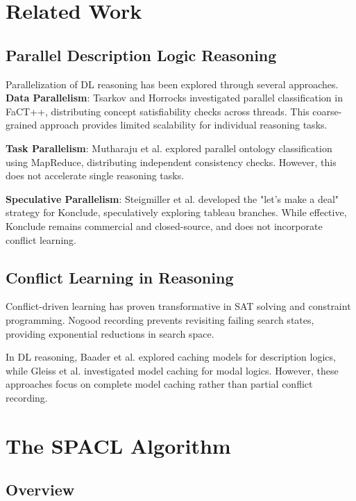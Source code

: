 \documentclass[10pt,a4paper]{article}
\begin{document}
\section{Related Work}
\label{sec:related}

\subsection{Parallel Description Logic Reasoning}

Parallelization of DL reasoning has been explored through several approaches. \textbf{Data Parallelism}: Tsarkov and Horrocks investigated parallel classification in FaCT++, distributing concept satisfiability checks across threads. This coarse-grained approach provides limited scalability for individual reasoning tasks.

\textbf{Task Parallelism}: Mutharaju et al. explored parallel ontology classification using MapReduce, distributing independent consistency checks. However, this does not accelerate single reasoning tasks.

\textbf{Speculative Parallelism}: Steigmiller et al. developed the "let's make a deal" strategy for Konclude, speculatively exploring tableau branches. While effective, Konclude remains commercial and closed-source, and does not incorporate conflict learning.

\subsection{Conflict Learning in Reasoning}

Conflict-driven learning has proven transformative in SAT solving and constraint programming. Nogood recording prevents revisiting failing search states, providing exponential reductions in search space.

In DL reasoning, Baader et al. explored caching models for description logics, while Gleiss et al. investigated model caching for modal logics. However, these approaches focus on complete model caching rather than partial conflict recording.

\section{The SPACL Algorithm}
\label{sec:algorithm}

\subsection{Overview}
\end{document}
